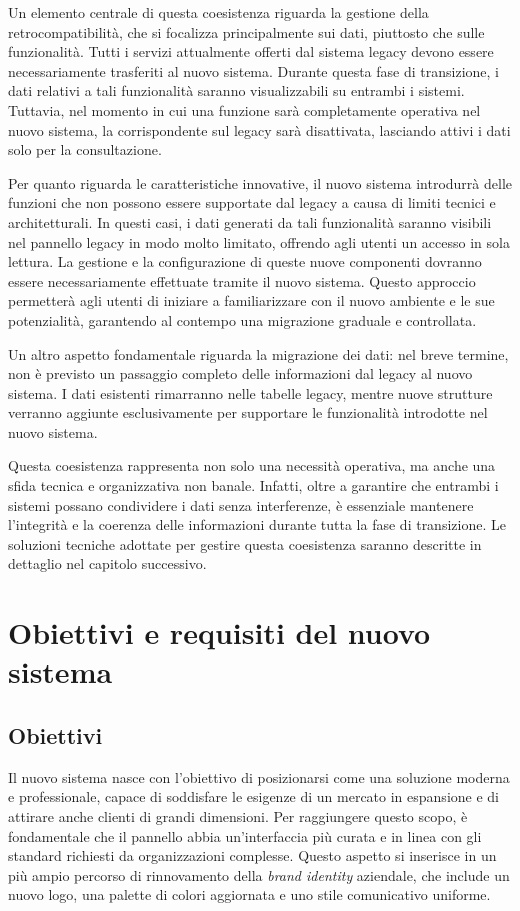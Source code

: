 Un elemento centrale di questa coesistenza riguarda la gestione della retrocompatibilità, che si focalizza principalmente sui dati, piuttosto che sulle funzionalità. Tutti i servizi attualmente offerti dal sistema legacy devono essere necessariamente trasferiti al nuovo sistema. Durante questa fase di transizione, i dati relativi a tali funzionalità saranno visualizzabili su entrambi i sistemi. Tuttavia, nel momento in cui una funzione sarà completamente operativa nel nuovo sistema, la corrispondente sul legacy sarà disattivata, lasciando attivi i dati solo per la consultazione.

Per quanto riguarda le caratteristiche innovative, il nuovo sistema introdurrà delle funzioni che non possono essere supportate dal legacy a causa di limiti tecnici e architetturali. In questi casi, i dati generati da tali funzionalità saranno visibili nel pannello legacy in modo molto limitato, offrendo agli utenti un accesso in sola lettura. La gestione e la configurazione di queste nuove componenti dovranno essere necessariamente effettuate tramite il nuovo sistema. Questo approccio permetterà agli utenti di iniziare a familiarizzare con il nuovo ambiente e le sue potenzialità, garantendo al contempo una migrazione graduale e controllata.

Un altro aspetto fondamentale riguarda la migrazione dei dati: nel breve termine, non è previsto un passaggio completo delle informazioni dal legacy al nuovo sistema. I dati esistenti rimarranno nelle tabelle legacy, mentre nuove strutture verranno aggiunte esclusivamente per supportare le funzionalità introdotte nel nuovo sistema.

Questa coesistenza rappresenta non solo una necessità operativa, ma anche una sfida tecnica e organizzativa non banale. Infatti, oltre a garantire che entrambi i sistemi possano condividere i dati senza interferenze, è essenziale mantenere l’integrità e la coerenza delle informazioni durante tutta la fase di transizione. Le soluzioni tecniche adottate per gestire questa coesistenza saranno descritte in dettaglio nel capitolo successivo.

\section{Obiettivi e requisiti del nuovo sistema}
\subsection{Obiettivi}
Il nuovo sistema nasce con l'obiettivo di posizionarsi come una soluzione moderna e professionale, capace di soddisfare le esigenze di un mercato in espansione e di attirare anche clienti di grandi dimensioni. Per raggiungere questo scopo, è fondamentale che il pannello abbia un'interfaccia più curata e in linea con gli standard richiesti da organizzazioni complesse. Questo aspetto si inserisce in un più ampio percorso di rinnovamento della \textit{brand identity} aziendale, che include un nuovo logo, una palette di colori aggiornata e uno stile comunicativo uniforme.

